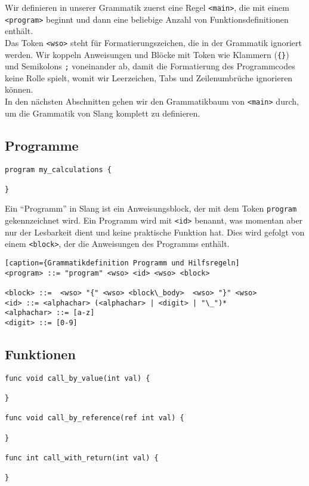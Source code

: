 Wir definieren in unserer Grammatik zuerst eine Regel \texttt{<main>}, die mit einem \texttt{<program>} beginnt und dann eine beliebige Anzahl von Funktionsdefinitionen enthält.\\
Das Token \texttt{<wso>} steht für Formatierungszeichen, die in der Grammatik ignoriert werden.
Wir koppeln Anweisungen und Blöcke mit Token wie Klammern (\texttt{\{\}}) und Semikolons \texttt{;} voneinander ab, damit die Formatierung des Programmcodes keine Rolle spielt, womit wir Leerzeichen, Tabs und Zeilenumbrüche ignorieren können.\\
In den nächsten Abschnitten gehen wir den Grammatikbaum von \texttt{<main>} durch, um die Grammatik von Slang komplett zu definieren.\\

\subsection{Programme}

\begin{lstlisting}[caption={Slang Beispiel Programmdeklaration}]
program my_calculations {

}
\end{lstlisting}

Ein ``Programm'' in Slang ist ein Anweisungsblock, der mit dem Token \texttt{program} gekennzeichnet wird.
Ein Programm wird mit \texttt{<id>} benannt, was momentan aber nur der Lesbarkeit dient und keine praktische Funktion hat.
Dies wird gefolgt von einem \texttt{<block>}, der die Anweisungen des Programms enthält.

\begin{lstlisting}[caption={Grammatikdefinition Programm und Hilfsregeln]
<program> ::= "program" <wso> <id> <wso> <block>

<block> ::=  <wso> "{" <wso> <block\_body>  <wso> "}" <wso>
<id> ::= <alphachar> (<alphachar> | <digit> | "\_")*
<alphachar> ::= [a-z]
<digit> ::= [0-9]
\end{lstlisting}

\subsection{Funktionen}

\begin{lstlisting}[caption={Slang Beispiel Funktionsdefinitionen}]
func void call_by_value(int val) {

}

func void call_by_reference(ref int val) {

}

func int call_with_return(int val) {

}
\end{lstlisting}


